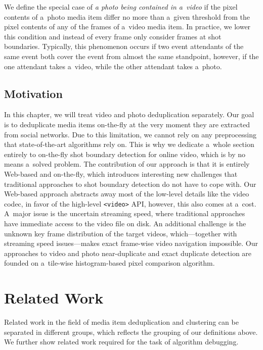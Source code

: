 We define the special case of
\emph{a photo being contained in a~video} if the pixel contents
of a~photo media item differ no more than a~given threshold from
the pixel contents of any of the frames of a~video media item.
In practice, we lower this condition and instead of every frame
only consider frames at shot boundaries.
Typically, this phenomenon occurs if two event attendants
of the same event both cover the event from almost the same
standpoint, however, if the one attendant takes a~video,
while the other attendant takes a~photo.

\subsection{Motivation}

In this chapter, we will treat video
and photo deduplication separately. 
Our goal is to deduplicate media items on-the-fly
at the very moment they are extracted from social networks.
Due to this limitation, we cannot rely on any preprocessing
that state-of-the-art algorithms rely on.
This is why we dedicate a~whole section entirely to on-the-fly
shot boundary detection for online video,
which is by no means a~solved problem.
The contribution of our approach is that it is entirely Web-based
and on-the-fly, which introduces interesting new challenges
that traditional approaches to shot boundary detection
do not have to cope with.
Our Web-based approach abstracts away most of the low-level details
like the video codec, in favor of the high-level \texttt{<video>}
API, however, this also comes at a~cost.
A~major issue is the uncertain streaming speed,
where traditional approaches have immediate access
to the video file on disk.
An additional challenge is the unknown key frame distribution
of the target videos, which---together with streaming speed
issues---makes exact frame-wise video navigation impossible.
Our approaches to video and photo near-duplicate
and exact duplicate detection are founded
on a~tile-wise histogram-based pixel comparison algorithm.

\section{Related Work}

Related work in the field of media item deduplication
and clustering can be separated in different groups,
which reflects the grouping of our definitions above.
We further show related work required for the task of 
algorithm debugging.

